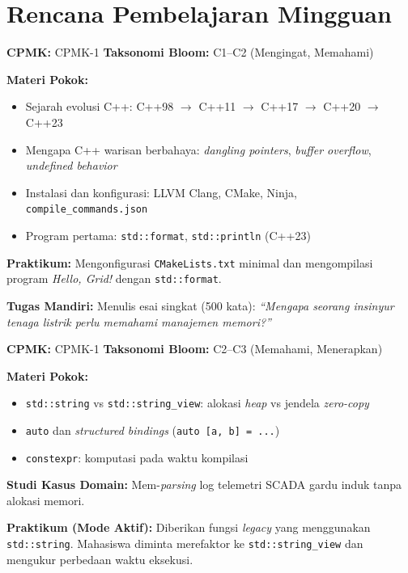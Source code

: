 \documentclass[12pt,a4paper]{article}
\begin{document}
\newpage
\section*{Rencana Pembelajaran Mingguan}

\begin{tcolorbox}[colback=white, colframe=uniblue, title={\textbf{Minggu 1: Filosofi C++ Modern \& Ekosistem Toolchain}}, fonttitle=\bfseries\color{white}, coltitle=white, colbacktitle=uniblue]
\textbf{CPMK:} CPMK-1 \hfill \textbf{Taksonomi Bloom:} C1--C2 (Mengingat, Memahami)

\textbf{Materi Pokok:}
\begin{itemize}[nosep]
    \item Sejarah evolusi C++: C++98 $\to$ C++11 $\to$ C++17 $\to$ C++20 $\to$ C++23
    \item Mengapa C++ warisan berbahaya: \textit{dangling pointers}, \textit{buffer overflow}, \textit{undefined behavior}
    \item Instalasi dan konfigurasi: LLVM Clang, CMake, Ninja, \texttt{compile\_commands.json}
    \item Program pertama: \texttt{std::format}, \texttt{std::println} (C++23)
\end{itemize}

\textbf{Praktikum:}
Mengonfigurasi \texttt{CMakeLists.txt} minimal dan mengompilasi program \textit{Hello, Grid!} dengan \texttt{std::format}.

\textbf{Tugas Mandiri:}
Menulis esai singkat (500 kata): \textit{``Mengapa seorang insinyur tenaga listrik perlu memahami manajemen memori?''}
\end{tcolorbox}

\begin{tcolorbox}[colback=white, colframe=uniblue, title={\textbf{Minggu 2: Abstraksi Tanpa Biaya I --- \texttt{string\_view} \& Parsing}}, fonttitle=\bfseries\color{white}, coltitle=white, colbacktitle=uniblue]
\textbf{CPMK:} CPMK-1 \hfill \textbf{Taksonomi Bloom:} C2--C3 (Memahami, Menerapkan)

\textbf{Materi Pokok:}
\begin{itemize}[nosep]
    \item \texttt{std::string} vs \texttt{std::string\_view}: alokasi \textit{heap} vs jendela \textit{zero-copy}
    \item \texttt{auto} dan \textit{structured bindings} (\texttt{auto [a, b] = ...})
    \item \texttt{constexpr}: komputasi pada waktu kompilasi
\end{itemize}

\textbf{Studi Kasus Domain:}
Mem-\textit{parsing} log telemetri SCADA gardu induk tanpa alokasi memori.

\textbf{Praktikum (Mode Aktif):}
Diberikan fungsi \textit{legacy} yang menggunakan \texttt{std::string}. Mahasiswa diminta merefaktor ke \texttt{std::string\_view} dan mengukur perbedaan waktu eksekusi.
\end{tcolorbox}
\end{document}
